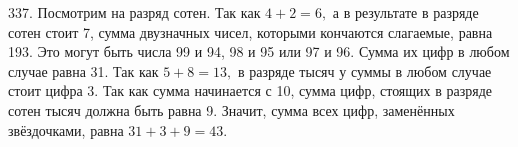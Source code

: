 337. Посмотрим на разряд сотен. Так как $4+2=6,$ а в результате в разряде сотен стоит 7, сумма двузначных чисел, которыми кончаются слагаемые, равна 193. Это могут быть числа 99 и 94, 98 и 95 или 97 и 96. Сумма их цифр в любом случае равна 31. Так как $5+8=13,$ в разряде тысяч у суммы в любом случае стоит цифра 3. Так как сумма начинается с 10, сумма цифр, стоящих в разряде сотен тысяч должна быть равна 9. Значит, сумма всех цифр, заменённых звёздочками, равна $31+3+9=43.$\\
